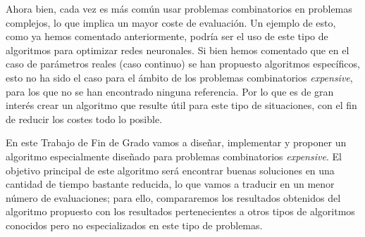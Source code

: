 Ahora bien, cada vez es más común usar problemas combinatorios en problemas complejos, lo que implica un mayor coste de evaluación. 
Un ejemplo de esto, como ya hemos comentado anteriormente, podría ser el uso de este tipo de algoritmos para optimizar redes neuronales. 
Si bien hemos comentado que en el caso de parámetros reales (caso continuo) se han propuesto algoritmos específicos, esto no ha sido el caso para el ámbito de los problemas combinatorios \textit{expensive}, para los que no se han encontrado ninguna referencia. 
Por lo que es de gran interés crear un algoritmo que resulte útil para este tipo de situaciones, con el fin de reducir los costes todo lo posible. 

En este Trabajo de Fin de Grado vamos a diseñar, implementar y proponer un algoritmo especialmente diseñado para problemas combinatorios \textit{expensive}. 
El objetivo principal de este algoritmo será encontrar buenas soluciones en una cantidad de tiempo bastante reducida, lo que vamos a traducir en un menor número de evaluaciones; para ello, compararemos los resultados obtenidos del algoritmo propuesto con los resultados pertenecientes a otros tipos de algoritmos conocidos pero no especializados en este tipo de problemas.